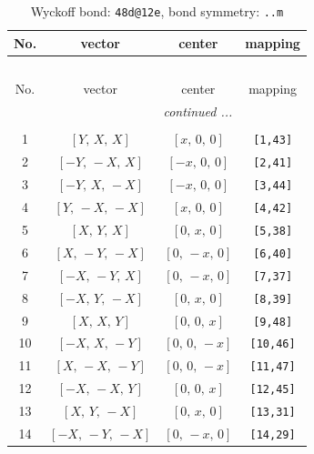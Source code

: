 \documentclass[fleqn,8pt]{jsarticle}
\begin{document}
\begin{longtable}{cccc}
\caption{Wyckoff bond: {\tt 48d@12e}, bond symmetry: {\tt ..m}}
 \\
 \hline \hline
No. & vector & center & mapping \\ \hline \endfirsthead

\multicolumn{3}{l}{\tablename\ \thetable{}} \\
 \hline \hline
No. & vector & center & mapping \\ \hline \endhead

 \hline \hline
\multicolumn{3}{r}{\footnotesize\it continued ...} \\ \endfoot

 \hline \hline
\multicolumn{3}{r}{} \\ \endlastfoot

1 & $\left[ Y,\, X,\, X \right]$ & $\left[ x,\, 0,\, 0 \right]$ & {\tt [1,43]} \\ \hline
2 & $\left[ - Y,\, - X,\, X \right]$ & $\left[ - x,\, 0,\, 0 \right]$ & {\tt [2,41]} \\ \hline
3 & $\left[ - Y,\, X,\, - X \right]$ & $\left[ - x,\, 0,\, 0 \right]$ & {\tt [3,44]} \\ \hline
4 & $\left[ Y,\, - X,\, - X \right]$ & $\left[ x,\, 0,\, 0 \right]$ & {\tt [4,42]} \\ \hline
5 & $\left[ X,\, Y,\, X \right]$ & $\left[ 0,\, x,\, 0 \right]$ & {\tt [5,38]} \\ \hline
6 & $\left[ X,\, - Y,\, - X \right]$ & $\left[ 0,\, - x,\, 0 \right]$ & {\tt [6,40]} \\ \hline
7 & $\left[ - X,\, - Y,\, X \right]$ & $\left[ 0,\, - x,\, 0 \right]$ & {\tt [7,37]} \\ \hline
8 & $\left[ - X,\, Y,\, - X \right]$ & $\left[ 0,\, x,\, 0 \right]$ & {\tt [8,39]} \\ \hline
9 & $\left[ X,\, X,\, Y \right]$ & $\left[ 0,\, 0,\, x \right]$ & {\tt [9,48]} \\ \hline
10 & $\left[ - X,\, X,\, - Y \right]$ & $\left[ 0,\, 0,\, - x \right]$ & {\tt [10,46]} \\ \hline
11 & $\left[ X,\, - X,\, - Y \right]$ & $\left[ 0,\, 0,\, - x \right]$ & {\tt [11,47]} \\ \hline
12 & $\left[ - X,\, - X,\, Y \right]$ & $\left[ 0,\, 0,\, x \right]$ & {\tt [12,45]} \\ \hline
13 & $\left[ X,\, Y,\, - X \right]$ & $\left[ 0,\, x,\, 0 \right]$ & {\tt [13,31]} \\ \hline
14 & $\left[ - X,\, - Y,\, - X \right]$ & $\left[ 0,\, - x,\, 0 \right]$ & {\tt [14,29]} \\ \hline

\end{longtable}
\end{document}
